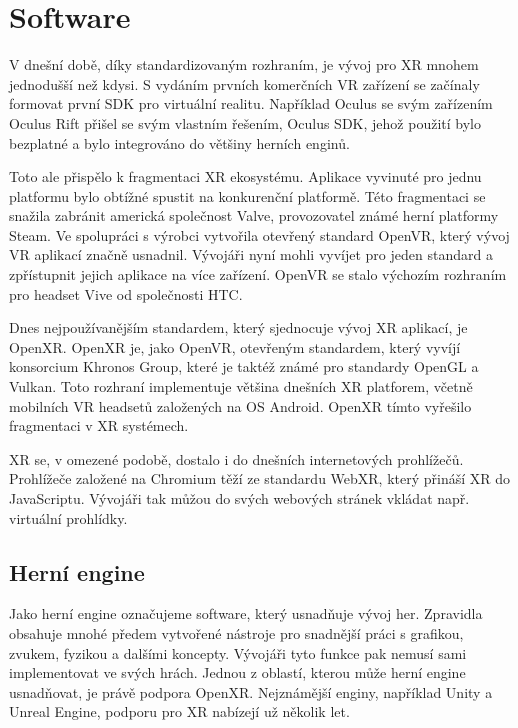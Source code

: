 \chapter{Software}

V dnešní době, díky standardizovaným rozhraním, je vývoj pro XR mnohem jednodušší než kdysi. S vydáním prvních komerčních VR zařízení se začínaly formovat první \gls{SDK} pro virtuální realitu. Například Oculus se svým zařízením Oculus Rift přišel se svým vlastním řešením, Oculus SDK, jehož použití bylo bezplatné a bylo integrováno do většiny herních enginů. \cite{enwiki:1193283032}

Toto ale přispělo k fragmentaci XR ekosystému. Aplikace vyvinuté pro jednu platformu bylo obtížné spustit na konkurenční platformě. Této fragmentaci se snažila zabránit americká společnost Valve, provozovatel známé herní platformy Steam. Ve spolupráci s výrobci vytvořila otevřený standard OpenVR, který vývoj VR aplikací značně usnadnil. Vývojáři nyní mohli vyvíjet pro jeden standard a zpřístupnit jejich aplikace na více zařízení. OpenVR se stalo výchozím rozhraním pro headset Vive od společnosti HTC. \cite{enwiki:1192992480}

Dnes nejpoužívanějším standardem, který sjednocuje vývoj XR aplikací, je OpenXR. OpenXR je, jako OpenVR, otevřeným standardem, který vyvíjí konsorcium Khronos Group, které je taktéž známé pro standardy OpenGL a Vulkan. Toto rozhraní implementuje většina dnešních XR platforem, včetně mobilních VR headsetů založených na OS Android. OpenXR tímto vyřešilo fragmentaci v XR systémech. \cite{enwiki:1186405367}

XR se, v omezené podobě, dostalo i do dnešních internetových prohlížečů. Prohlížeče založené na Chromium těží ze standardu WebXR, který přináší XR do JavaScriptu. Vývojáři tak můžou do svých webových stránek vkládat např. virtuální prohlídky. \cite{webxr_mdn}

\section{Herní engine}

Jako herní engine označujeme software, který usnadňuje vývoj her. Zpravidla obsahuje mnohé předem vytvořené nástroje pro snadnější práci s grafikou, zvukem, fyzikou a dalšími koncepty. Vývojáři tyto funkce pak nemusí sami implementovat ve svých hrách. Jednou z oblastí, kterou může herní engine usnadňovat, je právě podpora OpenXR. Nejznámější enginy, například Unity a Unreal Engine, podporu pro XR nabízejí už několik let. \cite{enwiki:1186405367}


